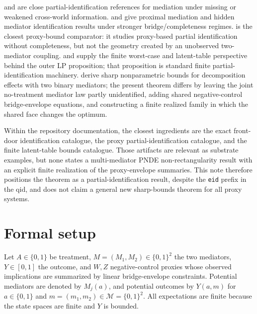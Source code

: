 \documentclass[11pt]{article}
\theoremstyle{definition}
\theoremstyle{plain}
\theoremstyle{remark}
\begin{document}
\cite{DingVanderWeele2016} and \cite{MilesKankiMeloniTchetgen2017} are close
partial-identification references for mediation under missing or weakened
cross-world information.  \cite{DukesShpitserTchetgen2023} and
\cite{GhassamiYangShpitserTchetgen2025} give proximal mediation and hidden
mediator identification results under stronger bridge/completeness regimes.
\cite{GhassamiShpitserTchetgen2023} is the closest proxy-bound comparator:
it studies proxy-based partial identification without completeness, but not
the geometry created by an unobserved two-mediator coupling.  \cite{Manski1990}
and \cite{BalkePearl1997} supply the finite worst-case and latent-table
perspective behind the outer LP proposition; that proposition is standard
finite partial-identification machinery.  \cite{GabrielSachsSjolander2023}
derive sharp nonparametric bounds for decomposition effects with two binary
mediators; the present theorem differs by leaving the joint no-treatment
mediator law partly unidentified, adding shared negative-control
bridge-envelope equations, and constructing a finite realized family in which
the shared face changes the optimum.

Within the repository documentation, the closest ingredients are the exact
front-door identification catalogue, the proxy partial-identification
catalogue, and the finite latent-table bounds catalogue.  Those artifacts are
relevant as substrate examples, but none states a multi-mediator PNDE
non-rectangularity result with an explicit finite realization of the
proxy-envelope summaries.  This note therefore positions the theorem as a
partial-identification result, despite the \texttt{eid} prefix in the qid, and
does not claim a general new sharp-bounds theorem for all proxy systems.

\section{Formal setup}
Let \(A\in\{0,1\}\) be treatment, \(M=(M_1,M_2)\in\{0,1\}^2\) the two
mediators, \(Y\in[0,1]\) the outcome, and \(W,Z\) negative-control proxies
whose observed implications are summarized by linear bridge-envelope
constraints.  Potential mediators are denoted by \(M_j(a)\), and
potential outcomes by \(Y(a,m)\) for \(a\in\{0,1\}\) and
\(m=(m_1,m_2)\in\mathcal M=\{0,1\}^2\).  All expectations are finite because
the state spaces are finite and \(Y\) is bounded.
\end{document}
